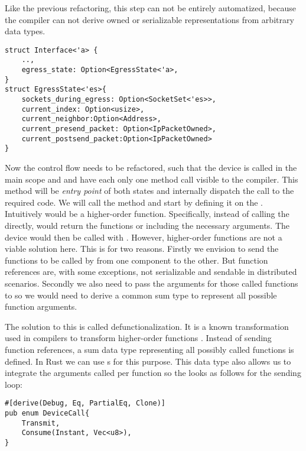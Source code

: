 Like the previous refactoring, this step can not be entirely automatized, because the compiler can not derive owned or serializable representations from arbitrary data types.

\begin{verbatim}
struct Interface<'a> {
    ..,
    egress_state: Option<EgressState<'a>,
}
struct EgressState<'es>{
    sockets_during_egress: Option<SocketSet<'es>>,
    current_index: Option<usize>,
    current_neighbor:Option<Address>,
    current_presend_packet: Option<IpPacketOwned>,
    current_postsend_packet:Option<IpPacketOwned>
}
\end{verbatim}

Now the control flow needs to be refactored, such that the device is called in the main scope and \dev{} and \stack{} have each only one method call visible to the compiler. This method will be \emph{entry point} of both states and internally dispatch the call to the required code. We will call the method  and start by defining it on the \dev{}. \\

Intuitively  would be a higher-order function. Specifically, instead of calling the \dev{} directly,  would return the functions  or  including the necessary arguments. The device would then be called with . However, higher-order functions are not a viable solution here. This is for two reasons. Firstly we envision to send the functions to be called by  from one component to the other. But function references are, with some exceptions, not serializable and sendable in distributed scenarios. Secondly we also need to pass the arguments for those called functions to  so we would need to derive a common sum type to represent all possible function arguments.

The solution to this is called defunctionalization. It is a known transformation used in compilers to transform higher-order functions \cite{reynolds1972definitional}. Instead of sending function references, a sum data type representing all possibly called functions is defined. In Rust we can use s for this purpose. This  data type also allows us to integrate the arguments called per function so the  looks as follows for the sending loop: 

\begin{verbatim}
#[derive(Debug, Eq, PartialEq, Clone)]
pub enum DeviceCall{
    Transmit,
    Consume(Instant, Vec<u8>),
}
\end{verbatim}

